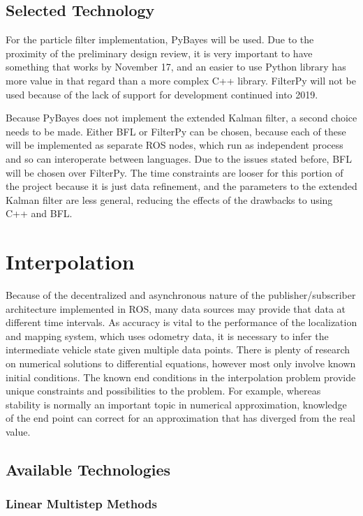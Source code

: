 \documentclass[10pt,draftclsnofoot,onecolumn]{article}
\begin{document}
\subsection{Selected Technology}

For the particle filter implementation, PyBayes will be used. Due to the proximity of the preliminary design review, it is very important to have something that works by November 17, and an easier to use Python library has more value in that regard than a more complex C++ library. FilterPy will not be used because of the lack of support for development continued into 2019. 


Because PyBayes does not implement the extended Kalman filter, a second choice needs to be made. Either BFL or FilterPy can be chosen, because each of these will be implemented as separate ROS nodes, which run as independent process and so can interoperate between languages. Due to the issues stated before, BFL will be chosen over FilterPy. The time constraints are looser for this portion of the project because it is just data refinement, and the parameters to the extended Kalman filter are less general, reducing the effects of the drawbacks to using C++ and BFL.

\section{Interpolation}

Because of the decentralized and asynchronous nature of the publisher/subscriber architecture implemented in ROS, many data sources may provide that data at different time intervals. As accuracy is vital to the performance of the localization and mapping system, which uses odometry data, it is necessary to infer the intermediate vehicle state given multiple data points. There is plenty of research on numerical solutions to differential equations, however most only involve known initial conditions. The known end conditions in the interpolation problem provide unique constraints and possibilities to the problem. For example, whereas stability is normally an important topic in numerical approximation, knowledge of the end point can correct for an approximation that has diverged from the real value. 

\subsection{Available Technologies}
\subsubsection{Linear Multistep Methods}
\end{document}
